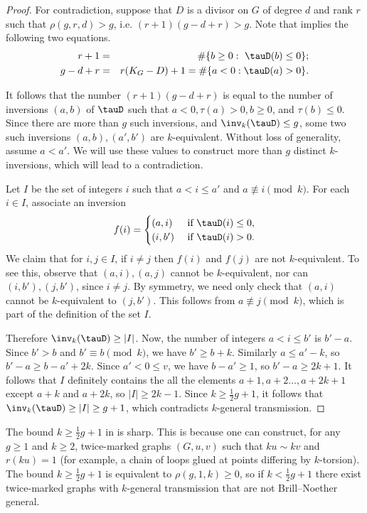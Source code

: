 \begin{proof}
For contradiction, suppose that $D$ is a divisor on $G$ of degree $d$ and rank $r$ such that $\rho(g,r,d) > g$, i.e. $(r+1)(g-d+r) > g$. 
Note that  implies the following two equations.
\begin{eqnarray*}
r+1 &=& \# \{ b \geq 0:\ \tauD(b) \leq 0 \};\\
g-d+r &=& r(K_G-D) +1 = \# \{ a < 0: \tauD(a) > 0 \}.
\end{eqnarray*}

It follows that the number $(r+1)(g-d+r)$ is equal to the number of inversions $(a,b)$ of $\tauD$ such that $a < 0, \tau(a) >0, b \geq 0$, and $\tau(b) \leq 0$.
Since there are more than $g$ such inversions, and $\inv_k(\tauD) \leq g$, some two such inversions $(a,b), (a',b')$ are $k$-equivalent. Without loss of generality, assume $a < a'$. We will use these values to construct more than $g$ distinct $k$-inversions, which will lead to a contradiction.

Let $I$ be the set of integers $i$ such that $a < i \leq a'$ and $a \not\equiv i \pmod{k}$. For each $i \in I$, associate an inversion $$f(i) = \begin{cases}
(a,i) & \mbox{ if } \tauD(i) \leq 0,\\
(i,b') & \mbox{ if } \tauD(i) > 0.
\end{cases}$$
We claim that for $i,j \in I$, if $i \neq j$ then $f(i)$ and $f(j)$ are not $k$-equivalent. To see this, observe that $(a,i),(a,j)$ cannot be $k$-equivalent, nor can $(i,b'),(j,b')$, since $i \neq j$. By symmetry, we need only check that $(a,i)$ cannot be $k$-equivalent to $(j,b')$. This follows from $a \not\equiv j \pmod{k}$, which is part of the definition of the set $I$.

Therefore $\inv_k(\tauD) \geq |I|$. Now, the number of integers $a < i \leq b'$ is $b'-a$. Since $b' > b$ and $b' \equiv b \pmod{k}$, we have $b' \geq b+k$. Similarly $a \leq a'-k$, so $b'-a \geq b-a' + 2k$. Since $a' < 0 \leq v$, we have $b-a' \geq 1$, so $b'-a \geq 2k+1$. It follows that $I$ definitely contains the all the elements $a+1, a+2 \ldots, a+2k+1$ except $a+k$ and $a+2k$, so $|I| \geq 2k-1$. Since $k \geq \frac12 g + 1$, it follows that $\inv_k(\tauD) \geq |I| \geq g+1$, which contradicts $k$-general transmission.
\end{proof}

\begin{rema}
The bound $k \geq \frac12 g + 1$ in  is sharp. This is because one can construct, for any $g \geq 1$ and $k \geq 2$, twice-marked graphs $(G,u,v)$ such that $ku \sim kv$ and $r(ku) = 1$ (for example, a chain of loops glued at points differing by $k$-torsion). The bound $k \geq \frac12 g + 1$ is equivalent to $\rho(g,1,k) \geq 0$, so if $k < \frac12 g + 1$ there exist twice-marked graphs with $k$-general transmission that are not Brill--Noether general.
\end{rema}

